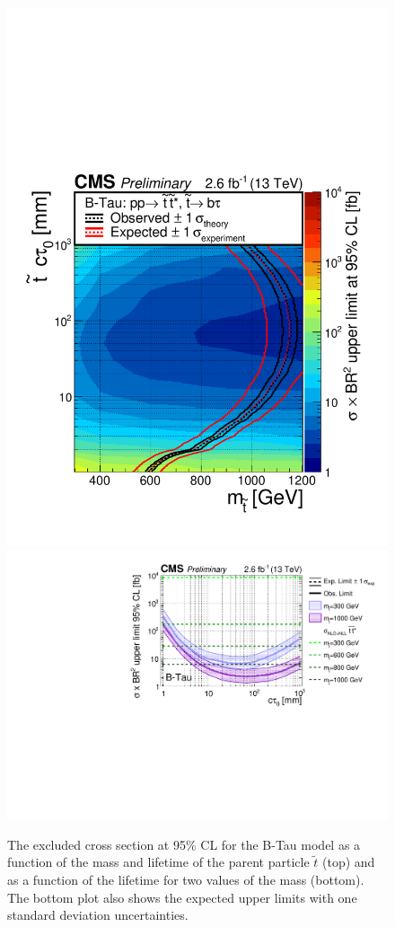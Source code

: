 \begin{figure}[tb]
\begin{center}
\includegraphics[width=.75\textwidth]{figures/pas//RESULT/UNBLINDED_LIMITS/B-Tau2D.pdf}
\includegraphics[width=.85\textwidth]{figures/pas//RESULT/UNBLINDED_LIMITS/B-Tau.pdf}
\caption{The excluded cross section at 95\% CL for the B-Tau model as
  a function of the mass and lifetime of the parent particle
  $\tilde{t}$ (top) and as a function of the lifetime for two values
  of the mass (bottom).  The bottom plot also shows the expected upper
  limits with one standard deviation
  uncertainties.\label{fig:dsusy_limit_tau}}
\end{center}
\end{figure}


